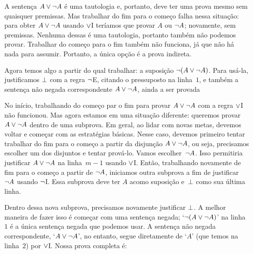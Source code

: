 A senten\c ca $A \vee \neg A$ \'e uma tautologia e, portanto, deve ter uma prova mesmo sem quaisquer premissas. Mas trabalhar do fim para o come\c co falha nessa situa\c c\~ao: para obter $A \vee \neg A$ usando $\vee$I ter\'iamos que provar $A$ ou $\neg A$; novamente, sem premissas. Nenhuma dessas \'e uma tautologia, portanto tamb\'em n\~ao podemos provar. Trabalhar  do come\c co para o fim tamb\'em n\~ao funciona, j\'a que n\~ao h\'a nada para assumir. Portanto, a \'unica op\c c\~ao \'e a prova indireta.
\begin{fitchproof}
	\open
	\ellipsesline
	\close
\end{fitchproof}
Agora temos algo a partir do qual trabalhar: a suposi\c c\~ao  $\neg(A \vee \neg A)$. Para us\'a-la, justificamos $\bot$ com a regra $\neg$E, citando o pressuposto na linha~$1$, e tamb\'em a senten\c ca n\~ao negada correspondente $A \vee \neg A$, ainda a ser provada
\begin{fitchproof}
	\open
	\ellipsesline
	\close
\end{fitchproof}


No in\'icio, trabalhando  do come\c co par o fim para provar $A \vee\neg A$ com a regra $\vee$I n\~ao funcionou. Mas agora estamos em uma situa\c c\~ao diferente: queremos provar $A \vee\neg A$ dentro de uma subprova. Em geral, ao lidar com novas metas, devemos voltar e come\c car com as estrat\'egias b\'asicas. Nesse caso, devemos primeiro tentar trabalhar do fim para o come\c co a partir da disjun\c c\~ao $A \vee \neg A$, ou seja, precisamos escolher um dos disjuntos  e tentar prov\'a-lo. Vamos escolher~$\neg A$. Isso permitiria justificar $A \vee \neg A$ na linha~$m - 1$ usando $\vee$I. Ent\~ao, trabalhando novamente de fim para o come\c co a partir de $\neg A$, iniciamos outra subprova a fim de justificar  $\neg A$ usando $\neg$I. Essa subprova deve ter $A$ acomo suposi\c c\~ao e~$\bot$ como sua \'ultima linha.
\begin{fitchproof}
	\open
	\open
	\ellipsesline
	\close
	\close
\end{fitchproof}
Dentro dessa nova subprova, precisamos novamente justificar $\bot$. A melhor maneira de fazer isso \'e come\c car com uma senten\c ca negada; `$\neg(A \vee \neg A)$' na linha~$1$ \'e a \'unica senten\c ca negada que podemos usar. A senten\c ca n\~ao negada correspondente,  `$A \vee \neg A$', no entanto, segue diretamente de `$A$' (que temos na linha~$2$) por $\vee$I. Nossa prova completa \'e:
\begin{fitchproof}
	\open
	\open
	\close
	\close
\end{fitchproof}

